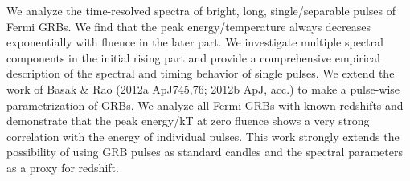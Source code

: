 


\bigskip



\bigskip

\noindent We analyze the time-resolved spectra of bright, long, single/separable pulses of Fermi GRBs. We find that the peak energy/temperature always decreases exponentially with fluence in the later part. We investigate multiple spectral components in the initial rising part and provide a comprehensive empirical description of the spectral and timing behavior of single pulses. We extend the work of Basak \& Rao (2012a ApJ745,76; 2012b ApJ, acc.) to make a pulse-wise parametrization of GRBs. We analyze all Fermi GRBs with known redshifts and demonstrate that the peak energy/kT at zero fluence shows a very strong correlation with the energy of  individual pulses. This work strongly extends the possibility of using GRB pulses as standard candles and the spectral parameters as a proxy for redshift.

